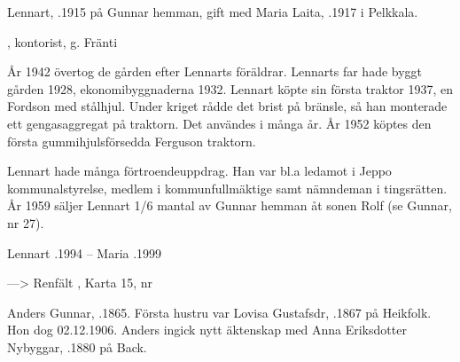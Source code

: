 \begin{jhchildren}
  \item {}
  \item {}
  \item {}
\end{jhchildren}


Lennart, .1915 på Gunnar hemman, gift med Maria Laita, .1917 i Pelkkala.

\begin{jhchildren}
  \item {}
  \item {}
  \item {}
  \item {}, kontorist, g. Fränti
  \item {}
  \item {}
\end{jhchildren}


År 1942 övertog de gården efter Lennarts föräldrar. Lennarts far hade byggt gården 1928, ekonomibyggnaderna 1932. Lennart köpte sin första traktor 1937, en Fordson med stålhjul. Under kriget rådde det brist på bränsle, så han monterade ett gengasaggregat på traktorn. Det användes i många år. År 1952 köptes den första gummihjulsförsedda Ferguson traktorn.

Lennart hade många förtroendeuppdrag. Han var bl.a ledamot i Jeppo kommunalstyrelse, medlem i kommunfullmäktige samt nämndeman i tingsrätten. År 1959 säljer Lennart 1/6 mantal av Gunnar hemman åt sonen Rolf (se Gunnar, nr 27).

Lennart .1994  --  Maria .1999


---> Renfält	,	Karta 15, nr 



Anders Gunnar, .1865. Första hustru var Lovisa Gustafsdr, .1867 på Heikfolk. Hon dog 02.12.1906. Anders ingick nytt äktenskap med Anna Eriksdotter Nybyggar, .1880 på Back.

